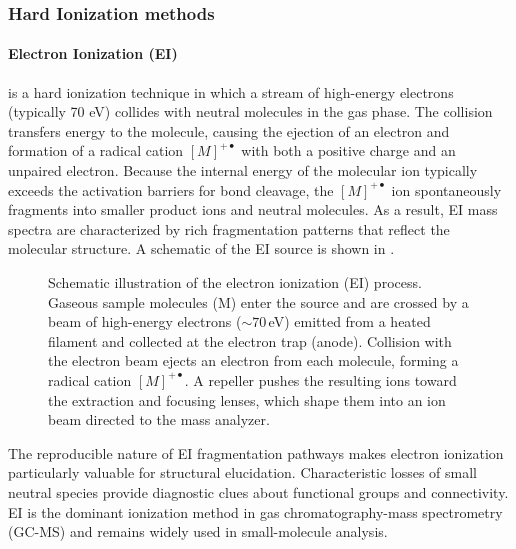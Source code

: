 \subsubsection{Hard Ionization methods}

\paragraph{Electron Ionization (EI)} is a hard ionization technique in which a stream of high-energy electrons (typically 70 eV) collides with neutral molecules in the gas phase. \cite[p.~197]{Gross2006}
The collision transfers energy to the molecule, causing the ejection of an electron and formation of a radical cation $[M]^{+\bullet}$ with both a positive charge and an unpaired electron. \cite[p.~194]{Gross2006}
Because the internal energy of the molecular ion typically exceeds the activation barriers for bond cleavage, the $[M]^{+\bullet}$ ion spontaneously fragments into smaller product ions and neutral molecules. \cite[p.~3]{Stoddard2016}
As a result, EI mass spectra are characterized by rich fragmentation patterns that reflect the molecular structure. \cite{Ashyrmamatov2025}
A schematic of the EI source is shown in .

\begin{figure}[H]
    \centering
    \resizebox{0.9\textwidth}{!}{}
    \caption[Schematic of EI ionization]{
        Schematic illustration of the electron ionization (EI) process.
        Gaseous sample molecules (M) enter the source and are crossed by a beam of high-energy electrons ($\sim 70$\,eV) emitted from a heated filament and collected at the electron trap (anode).
        Collision with the electron beam ejects an electron from each molecule, forming a radical cation $[M]^{+\bullet}$.
        A repeller pushes the resulting ions toward the extraction and focusing lenses, which shape them into an ion beam directed to the mass analyzer. \cite[p.18]{Dass2007}
    }
    \label{fig:ei-schematic}
\end{figure}


The reproducible nature of EI fragmentation pathways makes electron ionization particularly valuable for structural elucidation. \cite{VargasMedina2023}
Characteristic losses of small neutral species provide diagnostic clues about functional groups and connectivity. \cite{Bourcier2008}
EI is the dominant ionization method in gas chromatography-mass spectrometry (GC-MS) and remains widely used in small-molecule analysis. \cite[p.~1]{Amirav2021}

